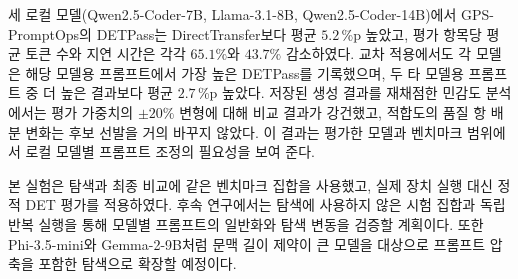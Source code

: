 \documentclass[10pt,twocolumn]{article}
\newenvironment{revision}{\begingroup\color{revisionblue}}{\endgroup}
\begin{document}
\begin{revision}
세 로컬 모델(Qwen2.5-Coder-7B, Llama-3.1-8B, Qwen2.5-Coder-14B)에서 GPS-PromptOps의 DETPass는 DirectTransfer보다 평균 $5.2$\,\%p 높았고, 평가 항목당 평균 토큰 수와 지연 시간은 각각 $65.1\%$와 $43.7\%$ 감소하였다. 교차 적용에서도 각 모델은 해당 모델용 프롬프트에서 가장 높은 DETPass를 기록했으며, 두 타 모델용 프롬프트 중 더 높은 결과보다 평균 $2.7$\,\%p 높았다. 저장된 생성 결과를 재채점한 민감도 분석에서는 평가 가중치의 $\pm20\%$ 변형에 대해 비교 결과가 강건했고, 적합도의 품질 항 배분 변화는 후보 선발을 거의 바꾸지 않았다. 이 결과는 평가한 모델과 벤치마크 범위에서 로컬 모델별 프롬프트 조정의 필요성을 보여 준다.
\end{revision}

\begin{revision}
본 실험은 탐색과 최종 비교에 같은 벤치마크 집합을 사용했고, 실제 장치 실행 대신 정적 DET 평가를 적용하였다. 후속 연구에서는 탐색에 사용하지 않은 시험 집합과 독립 반복 실행을 통해 모델별 프롬프트의 일반화와 탐색 변동을 검증할 계획이다. 또한 Phi-3.5-mini와 Gemma-2-9B처럼 문맥 길이 제약이 큰 모델을 대상으로 프롬프트 압축을 포함한 탐색으로 확장할 예정이다.
\end{revision}

\FloatBarrier
\end{document}
